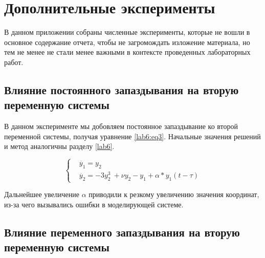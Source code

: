 \chapter{Дополнительные эксперименты}

В данном приложении собраны численные эксперименты, которые
не вошли в основное содержание отчета, чтобы не загромождать
изложение материала, но тем не менее не стали менее важными
в контексте проведенных лабораторных работ.

\section{Влияние постоянного запаздывания на вторую
переменную системы}

В данном эксперименте мы добовляем постоянное запаздывание
ко второй переменной системы, получая уравнение \ref{lab6:eq3}.
Начальные значения решений и метод аналогичны разделу \ref{lab6}.

\begin{equation}\label{lab6:eq3}
    \begin{cases}
        &\dot{y_1} = y_2\\
        &\dot{y_2} = -3y_2^3\ + \nu y_2 - y_1  + \alpha * y_1(t-\tau)
    \end{cases}
\end{equation}

\clearpage
{}
Дальнейшее увеличение $\alpha$ приводили к резкому увеличению значения координат,
из-за чего вызывались ошибки в моделирующей системе.

\clearpage
\section{Влияние переменного запаздывания на вторую
переменную системы}


